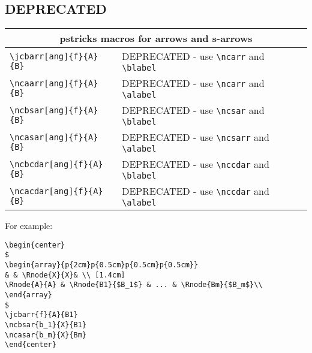 \documentclass[10pt,a4paper]{article}
\begin{document}
\newpage
\subsection{DEPRECATED}
\begin{tabular}{|l |  p{5cm} | c |}
    \hline
    \multicolumn{3}{|c|}{pstricks macros for arrows and s-arrows} \\
       \hline  
       \verb!\jcbarr[ang]{f}{A}{B}! & DEPRECATED - use \verb'\ncarr' and \verb'\blabel'&\\
       \hline
       \verb!\ncaarr[ang]{f}{A}{B}! & DEPRECATED - use \verb'\ncarr' and \verb'\alabel'&\\
       \hline     
       \verb!\ncbsar[ang]{f}{A}{B}! & DEPRECATED - use \verb'\ncsar' and \verb'\blabel'&\\ 
       \hline
       \verb!\ncasar[ang]{f}{A}{B}! & DEPRECATED - use \verb'\ncsarr' and \verb'\alabel'&\\
       \hline   
       \verb!\ncbcdar[ang]{f}{A}{B}! & DEPRECATED - use \verb'\nccdar' and \verb'\blabel'&\\
       \hline      
       \verb!\ncacdar[ang]{f}{A}{B}! & DEPRECATED - use \verb'\nccdar' and \verb'\alabel'&\\
       \hline       
\end{tabular}

\vspace{0.5cm}
\newpage
\noindent For example:
\begin{verbatim}
\begin{center}
$
\begin{array}{p{2cm}p{0.5cm}p{0.5cm}p{0.5cm}}
& & \Rnode{X}{X}& \\ [1.4cm]
\Rnode{A}{A} & \Rnode{B1}{$B_1$} & ... & \Rnode{Bm}{$B_m$}\\
\end{array}
$
\jcbarr{f}{A}{B1}
\ncbsar{b_1}{X}{B1}
\ncasar{b_m}{X}{Bm}
\end{center}
\end{verbatim}
\end{document}

